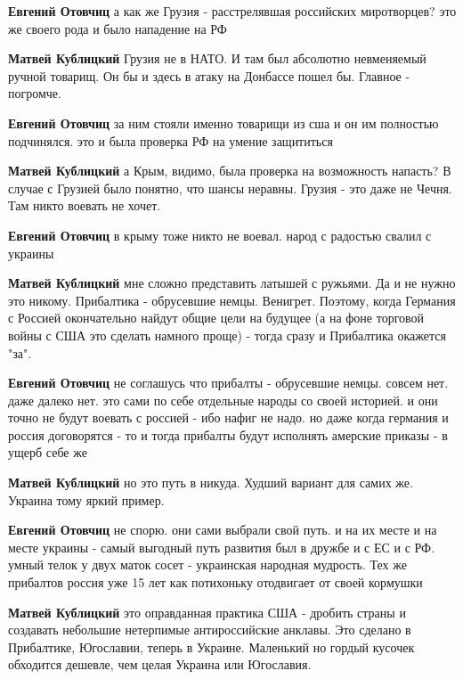 \begin{itemize}
\begin{itemize}
\textbf{Евгений Отовчиц} а как же Грузия - расстрелявшая российских миротворцев? это же своего рода и было нападение на РФ

\textbf{Матвей Кублицкий} Грузия не в НАТО. И там был абсолютно невменяемый ручной товарищ. Он бы и здесь в атаку на Донбассе пошел бы. Главное - погромче.

\textbf{Евгений Отовчиц} за ним стояли именно товарищи из сша и он им полностью подчинялся. это и была проверка РФ на умение защититься

\textbf{Матвей Кублицкий} а Крым, видимо, была проверка на возможность напасть?
В случае с Грузией было понятно, что шансы неравны. Грузия - это даже не Чечня. Там никто воевать не хочет.

\textbf{Евгений Отовчиц} в крыму тоже никто не воевал. народ с радостью свалил с украины

\textbf{Матвей Кублицкий} мне сложно представить латышей с ружьями.
Да и не нужно это никому. Прибалтика - обрусевшие немцы. Венигрет. Поэтому, когда Германия с Россией окончательно найдут общие цели на будущее (а на фоне торговой войны с США это сделать намного проще) - тогда сразу и Прибалтика окажется "за".

\textbf{Евгений Отовчиц} не соглашусь что прибалты - обрусевшие немцы. совсем нет. даже далеко нет. это сами по себе отдельные народы со своей историей. и они точно не будут воевать с россией - ибо нафиг не надо. но даже когда германия и россия договорятся - то и тогда прибалты будут исполнять амерские приказы - в ущерб себе же

\textbf{Матвей Кублицкий} но это путь в никуда. Худший вариант для самих же. Украина тому яркий пример.

\textbf{Евгений Отовчиц} не спорю. они сами выбрали свой путь. и на их месте и на месте украины - самый выгодный путь развития был в дружбе и с ЕС и с РФ. умный телок у двух маток сосет - украинская народная мудрость. Тех же прибалтов россия уже 15 лет как потихоньку отодвигает от своей кормушки

\textbf{Матвей Кублицкий} это оправданная практика США - дробить страны и создавать небольшие нетерпимые антироссийские анклавы. Это сделано в Прибалтике, Югославии, теперь в Украине. Маленький но гордый кусочек обходится дешевле, чем целая Украина или Югославия.


\end{itemize}
\end{itemize}
